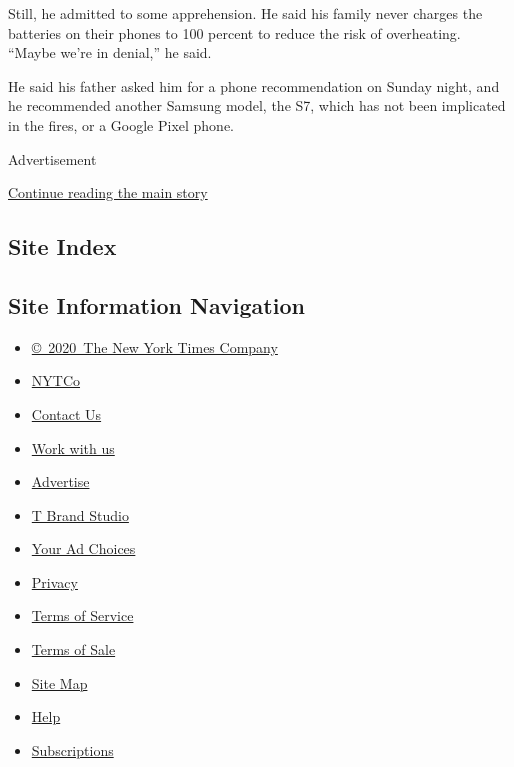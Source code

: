 Still, he admitted to some apprehension. He said his family never
charges the batteries on their phones to 100 percent to reduce the risk
of overheating. ``Maybe we're in denial,'' he said.

He said his father asked him for a phone recommendation on Sunday night,
and he recommended another Samsung model, the S7, which has not been
implicated in the fires, or a Google Pixel phone.

Advertisement

\protect\hyperlink{after-bottom}{Continue reading the main story}

\hypertarget{site-index}{%
\subsection{Site Index}\label{site-index}}

\hypertarget{site-information-navigation}{%
\subsection{Site Information
Navigation}\label{site-information-navigation}}

\begin{itemize}
\tightlist
\item
  \href{https://help.nytimes.com/hc/en-us/articles/115014792127-Copyright-notice}{©~2020~The
  New York Times Company}
\end{itemize}

\begin{itemize}
\tightlist
\item
  \href{https://www.nytco.com/}{NYTCo}
\item
  \href{https://help.nytimes.com/hc/en-us/articles/115015385887-Contact-Us}{Contact
  Us}
\item
  \href{https://www.nytco.com/careers/}{Work with us}
\item
  \href{https://nytmediakit.com/}{Advertise}
\item
  \href{http://www.tbrandstudio.com/}{T Brand Studio}
\item
  \href{https://www.nytimes.com/privacy/cookie-policy\#how-do-i-manage-trackers}{Your
  Ad Choices}
\item
  \href{https://www.nytimes.com/privacy}{Privacy}
\item
  \href{https://help.nytimes.com/hc/en-us/articles/115014893428-Terms-of-service}{Terms
  of Service}
\item
  \href{https://help.nytimes.com/hc/en-us/articles/115014893968-Terms-of-sale}{Terms
  of Sale}
\item
  \href{https://spiderbites.nytimes.com}{Site Map}
\item
  \href{https://help.nytimes.com/hc/en-us}{Help}
\item
  \href{https://www.nytimes.com/subscription?campaignId=37WXW}{Subscriptions}
\end{itemize}
